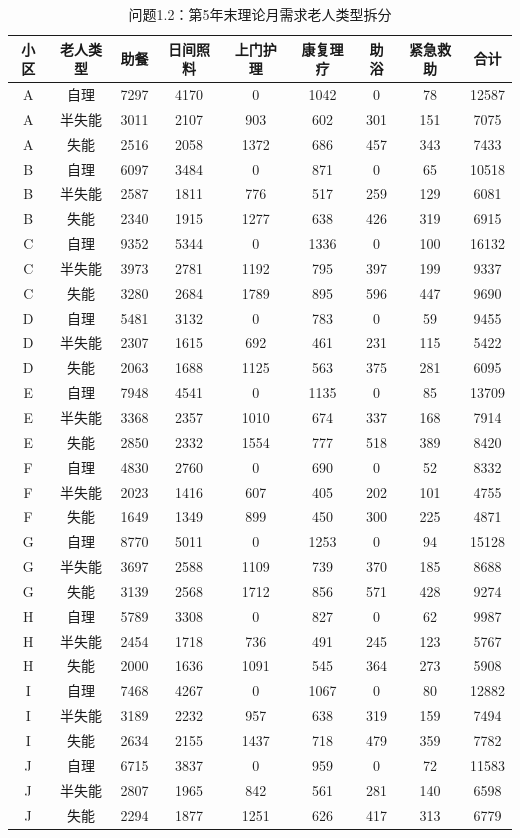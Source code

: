 \begin{table}[h]
\centering
\caption{问题1.2：第5年末理论月需求老人类型拆分}
\begin{tabular}{|c|c|c|c|c|c|c|c|c|}
\hline
小区 & 老人类型 & 助餐 & 日间照料 & 上门护理 & 康复理疗 & 助浴 & 紧急救助 & 合计 \\
\hline
A & 自理 & 7297 & 4170 & 0 & 1042 & 0 & 78 & 12587 \\
A & 半失能 & 3011 & 2107 & 903 & 602 & 301 & 151 & 7075 \\
A & 失能 & 2516 & 2058 & 1372 & 686 & 457 & 343 & 7433 \\
B & 自理 & 6097 & 3484 & 0 & 871 & 0 & 65 & 10518 \\
B & 半失能 & 2587 & 1811 & 776 & 517 & 259 & 129 & 6081 \\
B & 失能 & 2340 & 1915 & 1277 & 638 & 426 & 319 & 6915 \\
C & 自理 & 9352 & 5344 & 0 & 1336 & 0 & 100 & 16132 \\
C & 半失能 & 3973 & 2781 & 1192 & 795 & 397 & 199 & 9337 \\
C & 失能 & 3280 & 2684 & 1789 & 895 & 596 & 447 & 9690 \\
D & 自理 & 5481 & 3132 & 0 & 783 & 0 & 59 & 9455 \\
D & 半失能 & 2307 & 1615 & 692 & 461 & 231 & 115 & 5422 \\
D & 失能 & 2063 & 1688 & 1125 & 563 & 375 & 281 & 6095 \\
E & 自理 & 7948 & 4541 & 0 & 1135 & 0 & 85 & 13709 \\
E & 半失能 & 3368 & 2357 & 1010 & 674 & 337 & 168 & 7914 \\
E & 失能 & 2850 & 2332 & 1554 & 777 & 518 & 389 & 8420 \\
F & 自理 & 4830 & 2760 & 0 & 690 & 0 & 52 & 8332 \\
F & 半失能 & 2023 & 1416 & 607 & 405 & 202 & 101 & 4755 \\
F & 失能 & 1649 & 1349 & 899 & 450 & 300 & 225 & 4871 \\
G & 自理 & 8770 & 5011 & 0 & 1253 & 0 & 94 & 15128 \\
G & 半失能 & 3697 & 2588 & 1109 & 739 & 370 & 185 & 8688 \\
G & 失能 & 3139 & 2568 & 1712 & 856 & 571 & 428 & 9274 \\
H & 自理 & 5789 & 3308 & 0 & 827 & 0 & 62 & 9987 \\
H & 半失能 & 2454 & 1718 & 736 & 491 & 245 & 123 & 5767 \\
H & 失能 & 2000 & 1636 & 1091 & 545 & 364 & 273 & 5908 \\
I & 自理 & 7468 & 4267 & 0 & 1067 & 0 & 80 & 12882 \\
I & 半失能 & 3189 & 2232 & 957 & 638 & 319 & 159 & 7494 \\
I & 失能 & 2634 & 2155 & 1437 & 718 & 479 & 359 & 7782 \\
J & 自理 & 6715 & 3837 & 0 & 959 & 0 & 72 & 11583 \\
J & 半失能 & 2807 & 1965 & 842 & 561 & 281 & 140 & 6598 \\
J & 失能 & 2294 & 1877 & 1251 & 626 & 417 & 313 & 6779 \\
\hline
\end{tabular}
\end{table}
